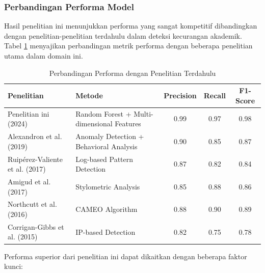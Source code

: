 \subsubsection{Perbandingan Performa Model}

Hasil penelitian ini menunjukkan performa yang sangat kompetitif dibandingkan dengan penelitian-penelitian terdahulu dalam deteksi kecurangan akademik. Tabel \ref{tabel:perbandinganPenelitianTerdahulu} menyajikan perbandingan metrik performa dengan beberapa penelitian utama dalam domain ini.

\begin{table}[htbp]
\centering
\caption{Perbandingan Performa dengan Penelitian Terdahulu}
\label{tabel:perbandinganPenelitianTerdahulu}
\begin{tabular}{|p{4cm}|p{3cm}|c|c|c|}
\hline
\textbf{Penelitian} & \textbf{Metode} & \textbf{Precision} & \textbf{Recall} & \textbf{F1-Score} \\
\hline
Penelitian ini (2024) & Random Forest + Multi-dimensional Features & 0.99 & 0.97 & 0.98 \\
\hline
Alexandron et al. (2019) & Anomaly Detection + Behavioral Analysis & 0.90 & 0.85 & 0.87 \\
\hline
Ruipérez-Valiente et al. (2017) & Log-based Pattern Detection & 0.87 & 0.82 & 0.84 \\
\hline
Amigud et al. (2017) & Stylometric Analysis & 0.85 & 0.88 & 0.86 \\
\hline
Northcutt et al. (2016) & CAMEO Algorithm & 0.88 & 0.90 & 0.89 \\
\hline
Corrigan-Gibbs et al. (2015) & IP-based Detection & 0.82 & 0.75 & 0.78 \\
\hline
\end{tabular}
\end{table}

Performa superior dari penelitian ini dapat dikaitkan dengan beberapa faktor kunci:

